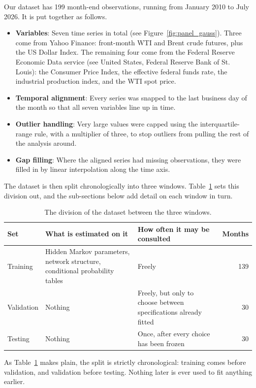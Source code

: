 \documentclass[11pt,a4paper]{article}
\begin{document}
Our dataset has 199 month-end observations, running from January 2010 to July 2026.
It is put together as follows.
\begin{itemize}
    \item \textbf{Variables}: Seven time series in total (see Figure~\ref{fig:panel_gauss}).
    Three come from Yahoo Finance: front-month WTI and Brent crude futures, plus the US Dollar Index.
    The remaining four come from the Federal Reserve Economic Data service (see United States, Federal
    Reserve Bank of St. Louis): the Consumer Price Index, the effective federal funds rate, the industrial
    production index, and the WTI spot price.
    \item \textbf{Temporal alignment}: Every series was snapped to the last business day of the month
    so that all seven variables line up in time.
    \item \textbf{Outlier handling}: Very large values were capped using the interquartile-range rule,
    with a multiplier of three, to stop outliers from pulling the rest of the analysis around.
    \item \textbf{Gap filling}: Where the aligned series had missing observations, they were filled in
    by linear interpolation along the time axis.
\end{itemize}

The dataset is then split chronologically into three windows. Table~\ref{tab:roles} sets this division out,
and the sub-sections below add detail on each window in turn.

\begin{table}[H]
\centering
\caption{The division of the dataset between the three windows.}
\label{tab:roles}
\renewcommand{\arraystretch}{1.2}
\begin{tabular}{@{}lp{5.1cm}p{4.6cm}r@{}}
\toprule
\textbf{Set} & \textbf{What is estimated on it} & \textbf{How often it may be consulted} &
\textbf{Months} \\
\midrule
Training   & Hidden Markov parameters, network structure, conditional probability tables &
Freely & 139 \\
Validation & Nothing & Freely, but only to choose between specifications already fitted & 30 \\
Testing    & Nothing & Once, after every choice has been frozen & 30 \\
\bottomrule
\end{tabular}
\end{table}

As Table~\ref{tab:roles} makes plain, the split is strictly chronological:
training comes before validation, and validation before testing. Nothing later is ever used to fit
anything earlier.
\end{document}
